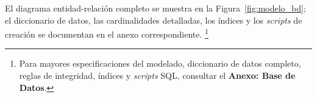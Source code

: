 El diagrama entidad-relación completo se muestra en la Figura~\ref{fig:modelo_bd}; el diccionario de datos, las cardinalidades detalladas, los índices y los \textit{scripts} de creación se documentan en el anexo correspondiente.%
\footnote{Para mayores especificaciones del modelado, diccionario de datos
completo, reglas de integridad, índices y \textit{scripts} SQL, consultar el
\textbf{Anexo: Base de Datos}.}


